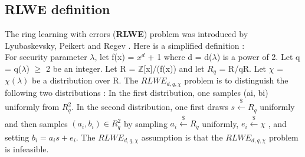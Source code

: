 \subsection{RLWE definition}
The ring learning with errors (\textbf{RLWE}) problem was introduced by Lyubaskevsky, Peikert and Regev \cite{RLWE}. Here is a simplified definition : \\
For security parameter $\lambda$, let f(x) = $x^d$ + 1 where d = d($\lambda$) is a power of 2. Let q = q($\lambda$) $\geq$ 2 be an integer. Let R = $\mathbb{Z}$[x]/(f(x)) and let $R_q$ = R/qR. Let $\chi$ = $\chi(\lambda)$ be a distribution over R. The $RLWE_{d,q,\chi}$ problem is to distinguish the following two distributions : 
\tabNormal In the first distribution, one samples (ai, bi) uniformly from $R^2_q$. 
\tabNormal In the second distribution, one first draws $s \xleftarrow[]{\$}R_q$  uniformly and then samples $(a_i, b_i) \in R^2_q$ by sampling $a_i \xleftarrow[]{\$}R_q$  uniformly, $e_i \xleftarrow[]{\$}\chi$ , and setting $b_i = a_i s + e_i$. The $RLWE_{d,q,\chi}$ assumption is that the $RLWE_{d,q,\chi}$ problem is infeasible.
